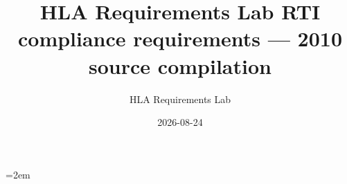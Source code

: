 \documentclass[10pt,oneside]{article}
\title{HLA Requirements Lab RTI compliance requirements --- 2010 source compilation}
\author{HLA Requirements Lab}
\date{2026-08-24}
\begin{document}
    
    \tableofcontents
    \clearpage
    \RaggedRight
    \emergencystretch=2em
    
\end{document}
